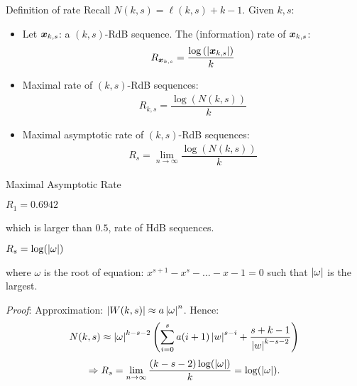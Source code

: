 \begin{frame}{Definition of rate}
    Recall $N(k,s) = \ell(k,s)+k-1$. Given $k,s$:
    \begin{itemize}
        \item Let ${\boldsymbol x}_{k,s}$: a $(k,s)$-RdB sequence. The (information) rate of ${\boldsymbol x}_{k,s}$:
        \begin{align}
            R_{{\boldsymbol x}_{k,s}} = \dfrac{\log\left(\left \lvert {\boldsymbol x}_{k,s} \right \rvert\right)}{k}
        \end{align}
        \pause
        \item Maximal rate of $(k,s)$-RdB sequences:
        \begin{align}
            R_{k,s} = \dfrac{\log(N(k,s))}{k}
        \end{align}
        \pause
        \item  Maximal asymptotic rate of $(k,s)$-RdB sequences:
        \begin{align}
            R_{s} = \lim_{n\to\infty}\dfrac{\log(N(k,s))}{k}
        \end{align}
    \end{itemize}
\end{frame}

\begin{frame}{Maximal Asymptotic Rate}
    \begin{theorem}
        \centering $R_{1}= 0.6942$
    \end{theorem}
    which is larger than $0.5$, rate of HdB sequences.
    \begin{theorem}
        \begin{center}
            $R_{s} = \log(\left \lvert \omega \right \rvert)$
        \end{center} 
        
        where $\omega$ is the root of equation: $x^{s+1}-x^{s}-\ldots-x-1=0$ such that $\left \lvert \omega \right \rvert$ is the largest.
    \end{theorem}
    \textit{Proof}: Approximation: $\left \lvert W(k,s) \right \rvert\approx a\left \lvert \omega \right \rvert^{n}$. Hence: 
    $$N(k,s)\approx \left \lvert \omega \right \rvert^{k-s-2}\left(\sum_{i=0}^{s}a(i+1)\left \lvert w \right \rvert^{s-i}+\dfrac{s+k-1}{\left \lvert w \right \rvert^{k-s-2}}\right)$$
    \[\Rightarrow R_{s} = \lim_{n\to\infty}\dfrac{(k-s-2)\log(\left \lvert \omega \right \rvert)}{k} = \log(\left \lvert \omega \right \rvert).\]
\end{frame}
